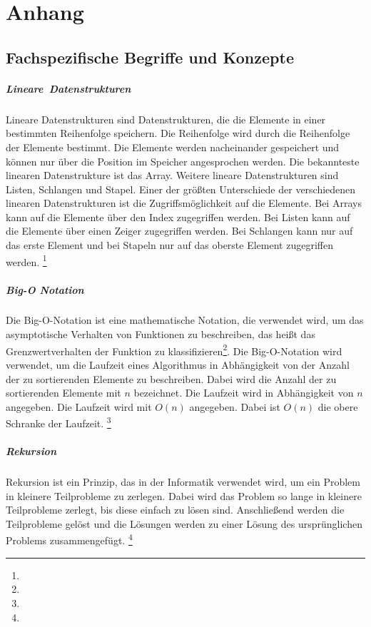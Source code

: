 \documentclass[./entry.tex]{subfiles}
\begin{document}
    \chapter{Anhang}

    \section{Fachspezifische Begriffe und Konzepte}

    \paragraph{Lineare\ Datenstrukturen}
    Lineare Datenstrukturen sind Datenstrukturen, die die Elemente in einer bestimmten Reihenfolge speichern. Die
    Reihenfolge wird durch die Reihenfolge der Elemente bestimmt. Die Elemente werden nacheinander gespeichert und
    können nur über die Position im Speicher angesprochen werden. Die bekannteste linearen Datenstrukture ist
    das Array. Weitere lineare Datenstrukturen sind Listen, Schlangen und Stapel.
    Einer der größten Unterschiede der verschiedenen linearen Datenstrukturen ist die Zugriffsmöglichkeit auf die
    Elemente. Bei Arrays kann auf die Elemente über den Index zugegriffen werden. Bei Listen kann auf die Elemente
    über einen Zeiger zugegriffen werden. Bei Schlangen kann nur auf das erste Element und bei
    Stapeln nur auf das oberste Element zugegriffen werden.
    \footnote{}

    \paragraph{Big-O Notation}
    Die Big-O-Notation ist eine mathematische Notation, die verwendet wird, um das asymptotische Verhalten von
    Funktionen zu beschreiben, das heißt das Grenzwertverhalten der Funktion zu klassifizieren\footnote{}.
    Die Big-O-Notation wird verwendet, um die Laufzeit eines Algorithmus in Abhängigkeit von der Anzahl der zu
    sortierenden Elemente zu beschreiben. Dabei wird die Anzahl der zu sortierenden Elemente mit $n$ bezeichnet.
    Die Laufzeit wird in Abhängigkeit von $n$ angegeben. Die Laufzeit wird mit $O(n)$ angegeben. Dabei ist $O(n)$
    die obere Schranke der Laufzeit.
    \footnote{}

    \paragraph{Rekursion}
    Rekursion ist ein Prinzip, das in der Informatik verwendet wird, um ein Problem in kleinere Teilprobleme zu
    zerlegen. Dabei wird das Problem so lange in kleinere Teilprobleme zerlegt, bis diese einfach zu lösen sind.
    Anschließend werden die Teilprobleme gelöst und die Lösungen werden zu einer Lösung des ursprünglichen Problems
    zusammengefügt.
    \footnote{}
\end{document}
